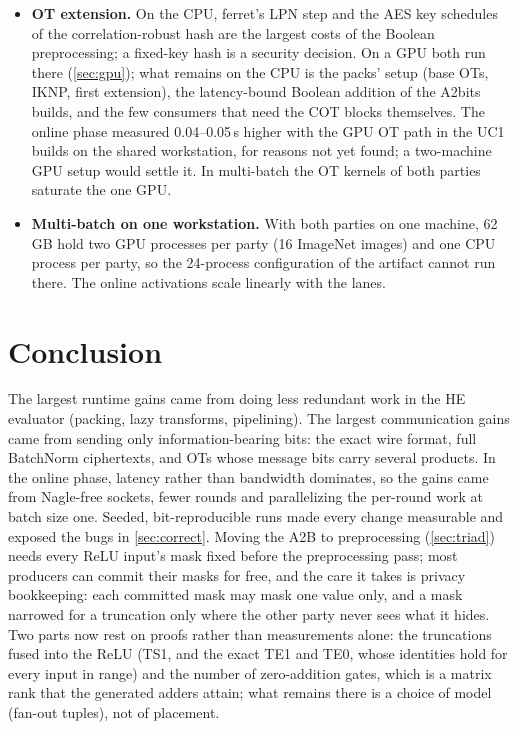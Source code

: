 \documentclass[10pt,a4paper]{article}
\newcommand{\s}{\,s\xspace}
\begin{document}
\begin{itemize}
  not yet understood, so it is off.
\item \textbf{OT extension.} On the CPU, ferret's LPN step and the AES key schedules of the correlation-robust hash
  are the largest costs of the Boolean preprocessing; a fixed-key hash is a security decision. On a GPU both run there
  (\cref{sec:gpu}); what remains on the CPU is the packs' setup (base OTs, IKNP, first extension), the latency-bound
  Boolean addition of the A2bits builds, and the few consumers that need the COT blocks themselves. The online phase
  measured 0.04--0.05\s higher with the GPU OT path in the UC1 builds on the shared workstation, for reasons not yet
  found; a two-machine GPU setup would settle it. In multi-batch the OT kernels of both parties saturate the one GPU.
\item \textbf{Multi-batch on one workstation.} With both parties on one machine, 62\,GB hold two GPU processes per party
  (16 ImageNet images) and one CPU process per party, so the 24-process configuration of the artifact cannot run there. The
  online activations scale linearly with the lanes.
\end{itemize}

\section{Conclusion}

The largest runtime gains came from doing less redundant work in the HE evaluator (packing, lazy
transforms, pipelining). The largest communication gains came from sending only information-bearing bits:
the exact wire format, full BatchNorm ciphertexts, and OTs whose message bits carry several products. In the online phase, latency rather than bandwidth
dominates, so the gains came from Nagle-free sockets, fewer rounds and parallelizing the per-round work at batch size
one. Seeded, bit-reproducible runs made every change measurable and exposed the bugs in \cref{sec:correct}.
Moving the A2B to preprocessing (\cref{sec:triad}) needs every ReLU input's mask fixed before the preprocessing pass;
most producers can commit their masks for free, and the care it takes is privacy bookkeeping: each committed mask may
mask one value only, and a mask narrowed for a truncation only where the other party never sees what it hides.
Two parts now rest on proofs rather than measurements alone: the truncations fused into the ReLU (TS1, and the exact
TE1 and TE0, whose identities hold for every input in range) and the number of zero-addition gates, which is a matrix
rank that the generated adders attain; what remains there is a choice of model (fan-out tuples), not of placement.
\end{document}
